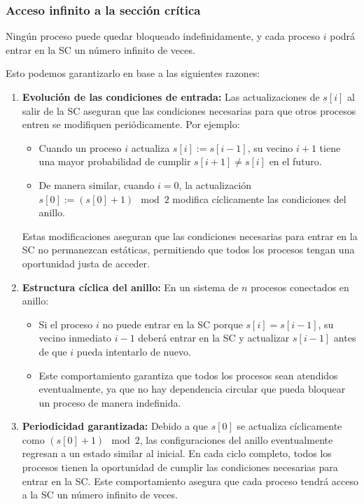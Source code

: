 \documentclass[a4paper,12pt]{article}
\begin{document}
\subsubsection{Acceso infinito a la sección crítica}

Ningún proceso puede quedar bloqueado indefinidamente, y cada proceso $i$ podrá entrar en la SC un número infinito de veces.

Esto podemos garantizarlo en base a las siguientes razones:

\begin{enumerate}
    \item \textbf{Evolución de las condiciones de entrada:}  
    Las actualizaciones de $s[i]$ al salir de la SC aseguran que las condiciones necesarias para que otros procesos entren se modifiquen periódicamente.  
    Por ejemplo:
    \begin{itemize}
        \item Cuando un proceso $i$ actualiza $s[i] := s[i-1]$, su vecino $i+1$ tiene una mayor probabilidad de cumplir $s[i+1] \neq s[i]$ en el futuro.
        \item De manera similar, cuando $i = 0$, la actualización $s[0] := (s[0] + 1) \mod 2$ modifica cíclicamente las condiciones del anillo.
    \end{itemize}
    Estas modificaciones aseguran que las condiciones necesarias para entrar en la SC no permanezcan estáticas, permitiendo que todos los procesos tengan una oportunidad justa de acceder.

    \item \textbf{Estructura cíclica del anillo:}  
    En un sistema de $n$ procesos conectados en anillo:
    \begin{itemize}
        \item Si el proceso $i$ no puede entrar en la SC porque $s[i] = s[i-1]$, su vecino inmediato $i-1$ deberá entrar en la SC y actualizar $s[i-1]$ antes de que $i$ pueda intentarlo de nuevo.
        \item Este comportamiento garantiza que todos los procesos sean atendidos eventualmente, ya que no hay dependencia circular que pueda bloquear un proceso de manera indefinida.
    \end{itemize}

    \item \textbf{Periodicidad garantizada:}  
    Debido a que $s[0]$ se actualiza cíclicamente como $(s[0] + 1) \mod 2$, las configuraciones del anillo eventualmente regresan a un estado similar al inicial.  
    En cada ciclo completo, todos los procesos tienen la oportunidad de cumplir las condiciones necesarias para entrar en la SC.  
    Este comportamiento asegura que cada proceso tendrá acceso a la SC un número infinito de veces.
\end{enumerate}
\end{document}
